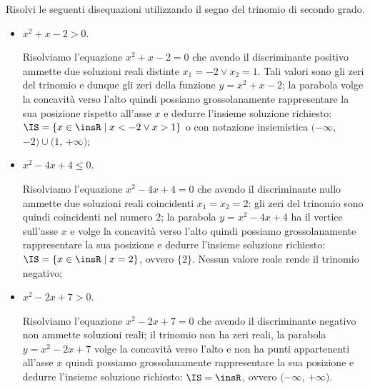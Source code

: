 \begin{exrig}
\begin{esempio}
Risolvi le seguenti disequazioni utilizzando il segno del trinomio di secondo grado.
\begin{itemize}
\item $x^2+x-2>0$.

Risolviamo l'equazione $x^2+x-2=0$ che avendo il discriminante positivo ammette due soluzioni reali distinte $x_1=-2\vee x_2=1$. Tali valori sono gli zeri del trinomio e dunque gli zeri della funzione $y=x^2+x-2$; la parabola volge la concavità verso l'alto quindi possiamo grossolanamente rappresentare la sua posizione rispetto all'asse $x$ e dedurre l'insieme soluzione richiesto: $\IS=\{x\in \insR \mid x<-2\vee x>1\}$ o con notazione insiemistica $(-\infty$, $-2)\cup (1$, $+\infty)$;
\item $x^2-4x+4\le 0$.

Risolviamo l'equazione $x^2-4x+4=0$ che avendo il discriminante nullo ammette due soluzioni reali coincidenti $x_1=x_2=2$: gli zeri del trinomio sono quindi coincidenti nel numero $2$; la parabola $y=x^2-4x+4$ ha il vertice sull'asse $x$ e volge la concavità verso l'alto quindi possiamo grossolanamente rappresentare la sua posizione e dedurre l'insieme soluzione richiesto: $\IS=\{x\in \insR \mid x=2\}$, ovvero $\{2\}$. Nessun valore reale rende il trinomio negativo;
\item $x^2-2x+7>0$.

Risolviamo l'equazione $x^2-2x+7=0$ che avendo il discriminante negativo non ammette soluzioni reali; il trinomio non ha zeri reali, la parabola $y=x^2-2x+7$ volge la concavità verso l'alto e non ha punti appartenenti all'asse $x$ quindi possiamo grossolanamente rappresentare la sua posizione e dedurre l'insieme soluzione richiesto: $\IS=\insR$, ovvero $(-\infty$, $+\infty)$.
\end{itemize}
\begin{center}
 
\end{center}
\end{esempio}
\end{exrig}
\vspazio\ovalbox{\risolvii \ref{ese:4.9}, \ref{ese:4.10}, \ref{ese:4.11}, \ref{ese:4.12}, \ref{ese:4.13}, \ref{ese:4.14}, \ref{ese:4.15}, \ref{ese:4.16}, \ref{ese:4.17}, \ref{ese:4.18}, \ref{ese:4.19}, \ref{ese:4.20}, \ref{ese:4.21},}

\vspazio\ovalbox{ \ref{ese:4.22}, \ref{ese:4.23}, \ref{ese:4.24}, \ref{ese:4.25}, \ref{ese:4.26}}

